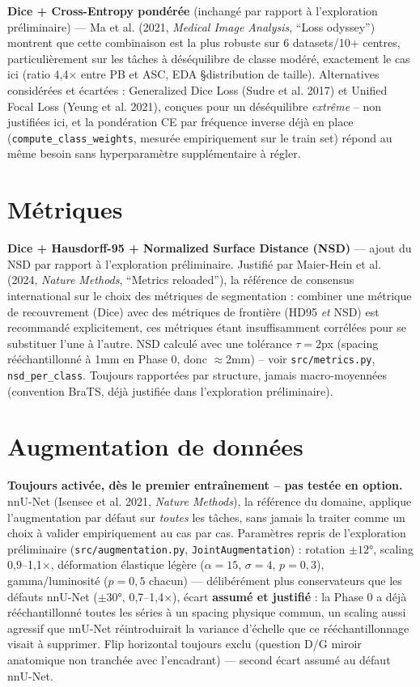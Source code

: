 \documentclass[11pt,a4paper]{report}
\begin{document}
\textbf{Dice + Cross-Entropy pondérée} (inchangé par rapport à l'exploration
préliminaire) --- Ma et al. (2021, \emph{Medical Image Analysis}, ``Loss odyssey'')
montrent que cette combinaison est la plus robuste sur 6 datasets/10+ centres,
particulièrement sur les tâches à déséquilibre de classe modéré, exactement le cas ici
(ratio 4,4$\times$ entre PB et ASC, EDA \S distribution de taille). Alternatives
considérées et écartées : Generalized Dice Loss (Sudre et al. 2017) et Unified Focal
Loss (Yeung et al. 2021), conçues pour un déséquilibre \emph{extrême} -- non
justifiées ici, et la pondération CE par fréquence inverse déjà en place
(\texttt{compute\_class\_weights}, mesurée empiriquement sur le train set) répond au
même besoin sans hyperparamètre supplémentaire à régler.

\section{Métriques}

\textbf{Dice + Hausdorff-95 + Normalized Surface Distance (NSD)} --- ajout du NSD par
rapport à l'exploration préliminaire. Justifié par Maier-Hein et al. (2024,
\emph{Nature Methods}, ``Metrics reloaded''), la référence de consensus international
sur le choix des métriques de segmentation : combiner une métrique de recouvrement
(Dice) avec des métriques de frontière (HD95 \emph{et} NSD) est recommandé
explicitement, ces métriques étant insuffisamment corrélées pour se substituer l'une
à l'autre. NSD calculé avec une tolérance $\tau=2$px (spacing rééchantillonné à 1mm
en Phase 0, donc $\approx$2mm) -- voir \texttt{src/metrics.py},
\texttt{nsd\_per\_class}. Toujours rapportées par structure, jamais macro-moyennées
(convention BraTS, déjà justifiée dans l'exploration préliminaire).

\section{Augmentation de données}

\textbf{Toujours activée, dès le premier entraînement -- pas testée en option.}
nnU-Net (Isensee et al. 2021, \emph{Nature Methods}), la référence du domaine,
applique l'augmentation par défaut sur \emph{toutes} les tâches, sans jamais la
traiter comme un choix à valider empiriquement au cas par cas. Paramètres repris de
l'exploration préliminaire (\texttt{src/augmentation.py}, \texttt{JointAugmentation})
: rotation $\pm12°$, scaling 0,9--1,1$\times$, déformation élastique légère
($\alpha=15$, $\sigma=4$, $p=0,3$), gamma/luminosité ($p=0,5$ chacun) --- délibérément
plus conservateurs que les défauts nnU-Net ($\pm30°$, 0,7--1,4$\times$), écart
\textbf{assumé et justifié} : la Phase 0 a déjà rééchantillonné toutes les séries à
un spacing physique commun, un scaling aussi agressif que nnU-Net réintroduirait la
variance d'échelle que ce rééchantillonnage visait à supprimer. Flip horizontal
toujours exclu (question D/G miroir anatomique non tranchée avec l'encadrant) ---
second écart assumé au défaut nnU-Net.
\end{document}
